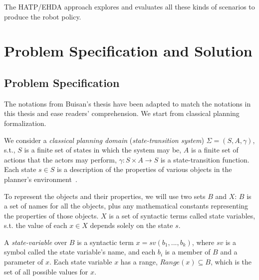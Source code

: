 The HATP/EHDA approach explores and evaluates all these kinds of scenarios to produce the robot policy.


\section{Problem Specification and Solution}

\subsection{Problem Specification}

The notations from Buisan's thesis have been adapted to match the notations in this thesis and ease readers' comprehension. We start from classical planning formalization.

We consider a \textit{classical planning domain} (\textit{state-transition system}) $\Sigma = (S, A,\gamma)$, s.t., $S$ is a finite set of states in which the system may be, $A$ is a finite set of actions that the actors may perform, $\gamma: S \times A \rightarrow S$ is a state-transition function. Each state $s \in S$ is a description of the properties of various objects in the planner's environment~\cite{naubooks0014222}. 

To represent the objects and their properties, we will use two sets $B$ and $X$: $B$ is a set of names for all the objects, plus any mathematical constants representing the properties of those objects. $X$ is a set of syntactic terms called state variables, s.t. the value of each $x \in X$ depends solely on the state $s$.

A \textit{state-variable} over $B$ is a syntactic term $x = sv(b_1, ..., b_k)$, where $sv$ is a symbol called the state variable's name, and each $b_i$ is a member of $B$ and a parameter of $x$. Each state variable $x$ has a range, $\textit{Range}(x) \subseteq B$, which is the set of all possible values for $x$.



